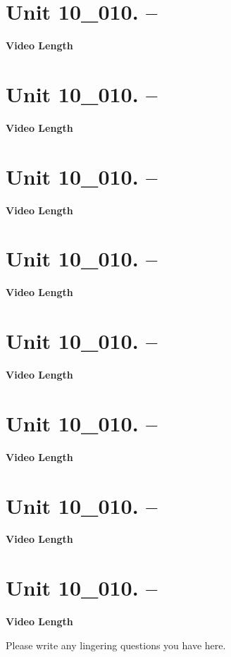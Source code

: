 \documentclass[letterpaper,12pt]{exam}
\newcommand{\unit}{Unit 10}
\begin{document}
\begin{questions}
\section*{\unit\_010. -- } 
\par{\selectfont\textbf{Video Length }}

\section*{\unit\_010. -- } 
\par{\selectfont\textbf{Video Length }}

\section*{\unit\_010. -- } 
\par{\selectfont\textbf{Video Length }}

\section*{\unit\_010. -- } 
\par{\selectfont\textbf{Video Length }}

\section*{\unit\_010. -- } 
\par{\selectfont\textbf{Video Length }}

\section*{\unit\_010. -- } 
\par{\selectfont\textbf{Video Length }}

\section*{\unit\_010. -- } 
\par{\selectfont\textbf{Video Length }}

\section*{\unit\_010. -- } 
\par{\selectfont\textbf{Video Length }}



Please write any lingering questions you have here.


\end{questions}
\end{document}

